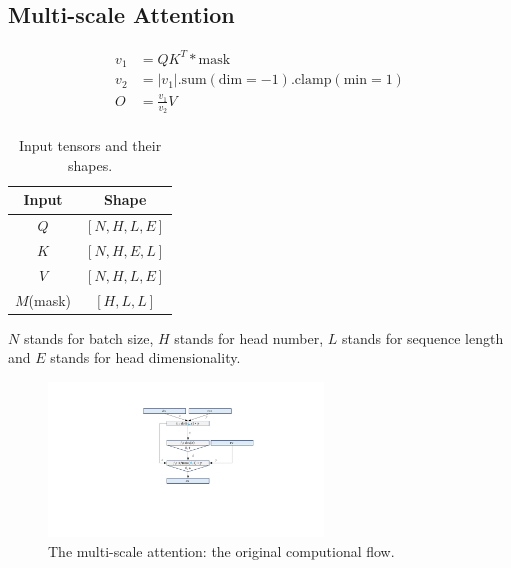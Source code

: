 \subsection{Multi-scale Attention}

\begin{align*}
v_1 &= QK^T * \text{mask}\\
v_2 &= |v_1|.\text{sum}(\text{dim}=-1).\text{clamp}(\text{min}=1) \\
O &= \frac{v_1}{v_2}V  \\
\end{align*}

\begin{table}[!htbp]
    \setlength{\tabcolsep}{4pt}
    \centering
    \caption{Input tensors and their shapes.}
    \begin{tabular}{c|c}
    \textbf{Input}&\textbf{Shape} \\\midrule
    $Q$ & $[N, H, L, E]$ \\
    $K$ & $[N, H, E, L]$ \\
    $V$ & $[N, H, L, E]$ \\
    $M$(mask) & $[H, L, L]$
    \end{tabular}
\end{table}

$N$ stands for batch size, $H$ stands for head number, $L$ stands for sequence length and $E$ stands for head dimensionality.


\begin{figure}[h]
    \centering
    \includegraphics[width=0.65\textwidth]{figures/multi-scale-attn1.pdf}
    \caption{The multi-scale attention: the original computional flow.}
\end{figure}

